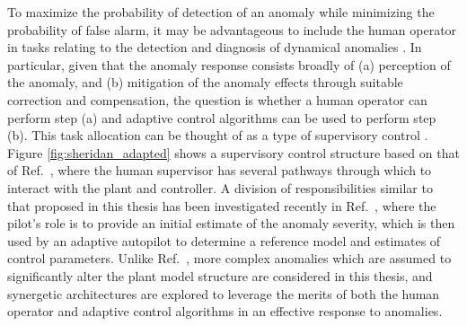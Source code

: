 To maximize the probability of detection of an anomaly while minimizing the probability of false alarm, it may be advantageous to include the human operator in tasks relating to the detection and diagnosis of dynamical anomalies \cite{sheridan2000human}. In particular, given that the anomaly response consists broadly of (a) perception of the anomaly, and (b) mitigation of the anomaly effects through suitable correction and compensation, the question is whether a human operator can perform step (a) and adaptive control algorithms can be used to perform step (b). This task allocation can be thought of as a type of supervisory control \cite{sheridan1976toward, sheridan2011adaptive}. Figure \ref{fig:sheridan_adapted} shows a supervisory control structure based on that of Ref.~\cite{sheridan2011adaptive}, where the human supervisor has several pathways through which to interact with the plant and controller. A division of responsibilities similar to that proposed in this thesis has been investigated recently in Ref.~\cite{farjadian2017bumpless}, where the pilot's role is to provide an initial estimate of the anomaly severity, which is then used by an adaptive autopilot to determine a reference model and estimates of control parameters. Unlike Ref.~\cite{farjadian2017bumpless}, more complex anomalies which are assumed to significantly alter the plant model structure are considered in this thesis, and synergetic architectures are explored to leverage the merits of both the human operator and adaptive control algorithms in an effective response to anomalies.

